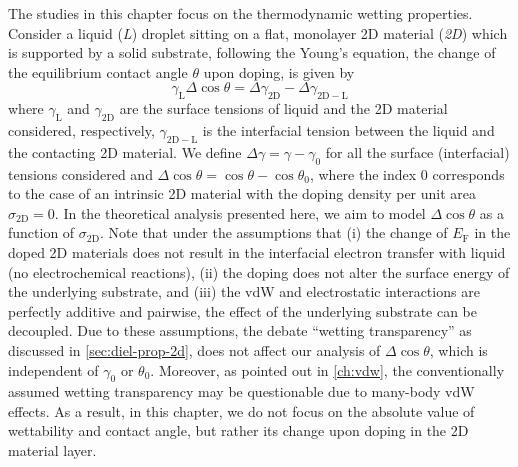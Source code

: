 The studies in this chapter focus on the thermodynamic wetting
properties.
%
Consider a liquid (\emph{L}) droplet sitting on a flat,
monolayer 2D material (\emph{2D}) which is supported by a solid substrate,
following the Young’s equation, the change of the equilibrium contact
angle \(\theta\) upon doping, is given by
\begin{equation}
\label{eqn:wet-def-Young-Delta-theta}
\gamma_{\mathrm{L}} \Delta \cos\theta = \Delta \gamma_{\mathrm{2D}}
                                 - \Delta \gamma_{\mathrm{2D-L}}
\end{equation}
where \(\gamma_{\mathrm{L}}\) and \(\gamma_{\mathrm{2D}}\) are the
surface tensions of liquid and the 2D material considered,
respectively, \(\gamma_{\mathrm{2D-L}}\) is the interfacial tension
between the liquid and the contacting 2D material. We define
\(\Delta \gamma = \gamma - \gamma_{0}\) for all the surface
(interfacial) tensions considered and
\(\Delta \cos \theta = \cos \theta - \cos \theta_{0}\), where the
index 0 corresponds to the case of an intrinsic 2D material with the
doping density per unit area \(\sigma_{\mathrm{2D}} = 0\).
%
In the
theoretical analysis presented here, we aim to model
\(\Delta \cos \theta\) as a function of \(\sigma_{\mathrm{2D}}\). Note
that under the assumptions that (i) the change of \(E_{\mathrm{F}}\)
in the doped 2D materials does not result in the interfacial electron
transfer with liquid (\ie no electro\-chemical reactions), (ii) the doping
does not alter the surface energy of the underlying substrate,
and (iii) the vdW and electrostatic interactions are perfectly
additive and pairwise, the effect of the underlying
substrate can be decoupled.
%
Due to these assumptions, the debate “wetting transparency”
\autocite{rafiee_2012_transparency,shih_2013_wetting_natmat} as discussed in \autoref{sec:diel-prop-2d}, does not
affect our analysis of \(\Delta \cos \theta\), which is independent of
\(\gamma_{0}\) or \(\theta_{0}\).
%
Moreover, as pointed out in \autoref{ch:vdw}, the conventionally
assumed wetting transparency may be questionable due to many-body vdW
effects. As a result, in this chapter, we do not focus on the
absolute value of wettability and contact angle, but rather its change
upon doping in the 2D material layer.

